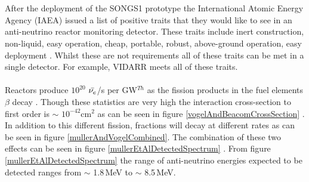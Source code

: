 \\\\After the deployment of the SONGS1 prototype the International Atomic Energy Agency (IAEA) issued a list of positive traits that they would like to see in an anti-neutrino reactor monitoring detector. These traits include inert construction, non-liquid, easy operation, cheap, portable, robust, above-ground operation, easy deployment \cite{IAEA_2008}. Whilst these are not requirements all of these traits can be met in a single detector. For example, VIDARR meets all of these traits. 
\\\\Reactors produce $10^{20}$ $\Bar{\nu_e}$/s per GW$^{Th}$ as the fission products in the fuel elements $\beta$ decay \cite{Mueller_2011}. Though these statistics are very high the interaction cross-section to first order is $\sim$ $10^{-42}$cm$^2$ as can be seen in figure \ref{vogelAndBeacomCrossSection} \cite{Vogel_1999}. In addition to this different fission, fractions will decay at different rates as can be seen in figure \ref{mullerAndVogelCombined}. The combination of these two effects can be seen in figure \ref{mullerEtAlDetectedSpectrum} \cite{Mueller_2011}. From figure \ref{mullerEtAlDetectedSpectrum} the range of anti-neutrino energies expected to be detected ranges from $\sim$ 1.8\,MeV to $\sim$ 8.5\,MeV.

